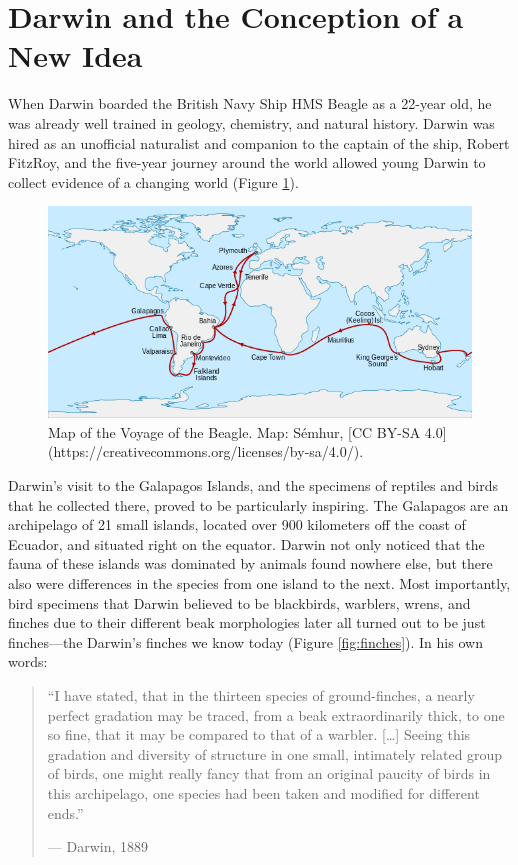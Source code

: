 \documentclass[
]{book}
\begin{document}
\hypertarget{darwin-and-the-conception-of-a-new-idea}{%
\section{Darwin and the Conception of a New Idea}\label{darwin-and-the-conception-of-a-new-idea}}

When Darwin boarded the British Navy Ship HMS Beagle as a 22-year old, he was already well trained in geology, chemistry, and natural history. Darwin was hired as an unofficial naturalist and companion to the captain of the ship, Robert FitzRoy, and the five-year journey around the world allowed young Darwin to collect evidence of a changing world (Figure \ref{fig:beaglemap}).

\begin{figure}
\includegraphics[width=1\linewidth]{images/voyage_beagle-01} \caption{Map of the Voyage of the Beagle. Map: Sémhur, [CC BY-SA 4.0](https://creativecommons.org/licenses/by-sa/4.0/).}\label{fig:beaglemap}
\end{figure}

Darwin's visit to the Galapagos Islands, and the specimens of reptiles and birds that he collected there, proved to be particularly inspiring. The Galapagos are an archipelago of 21 small islands, located over 900 kilometers off the coast of Ecuador, and situated right on the equator. Darwin not only noticed that the fauna of these islands was dominated by animals found nowhere else, but there also were differences in the species from one island to the next. Most importantly, bird specimens that Darwin believed to be blackbirds, warblers, wrens, and finches due to their different beak morphologies later all turned out to be just finches---the Darwin's finches we know today (Figure \ref{fig:finches}). In his own words:

\begin{quote}
``I have stated, that in the thirteen species of ground-finches, a nearly perfect gradation may be traced, from a beak extraordinarily thick, to one so fine, that it may be compared to that of a warbler. {[}\ldots{]} Seeing this gradation and diversity of structure in one small, intimately related group of birds, one might really fancy that from an original paucity of birds in this archipelago, one species had been taken and modified for different ends.''

--- Darwin, 1889
\end{quote}
\end{document}

